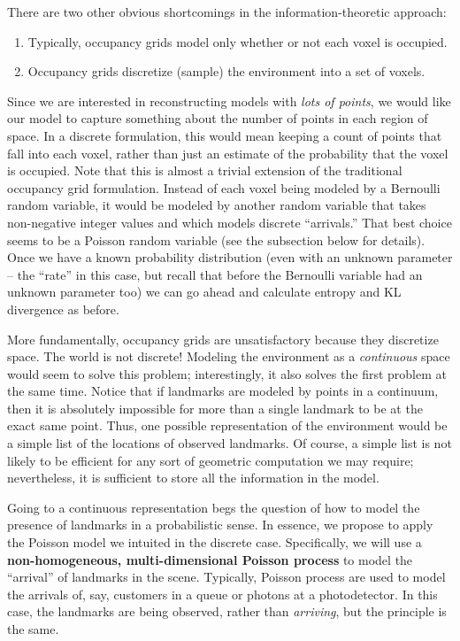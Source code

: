\documentclass[12pt]{article}
\begin{document}
There are two other obvious shortcomings in the information-theoretic approach:
\begin{enumerate}
\item Typically, occupancy grids model only whether or not each voxel is occupied.
\item Occupancy grids discretize (sample) the environment into a set of voxels.
\end{enumerate}

Since we are interested in reconstructing models with \textit{lots of points}, we would like our model to capture something about the number of points in each region of space. In a discrete formulation, this would mean keeping a count of points that fall into each voxel, rather than just an estimate of the probability that the voxel is occupied. Note that this is almost a trivial extension of the traditional occupancy grid formulation. Instead of each voxel being modeled by a Bernoulli random variable, it would be modeled by another random variable that takes non-negative integer values and which models discrete ``arrivals.'' That best choice seems to be a Poisson random variable (see the subsection below for details). Once we have a known probability distribution (even with an unknown parameter -- the ``rate'' in this case, but recall that before the Bernoulli variable had an unknown parameter too) we can go ahead and calculate entropy and KL divergence as before.

More fundamentally, occupancy grids are unsatisfactory because they discretize space. The world is not discrete! Modeling the environment as a \textit{continuous} space would seem to solve this problem; interestingly, it also solves the first problem at the same time. Notice that if landmarks are modeled by points in a continuum, then it is absolutely impossible for more than a single landmark to be at the exact same point. Thus, one possible representation of the environment would be a simple list of the locations of observed landmarks. Of course, a simple list is not likely to be efficient for any sort of geometric computation we may require; nevertheless, it is sufficient to store all the information in the model.

Going to a continuous representation begs the question of how to model the presence of landmarks in a probabilistic sense. In essence, we propose to apply the Poisson model we intuited in the discrete case. Specifically, we will use a \textbf{non-homogeneous, multi-dimensional Poisson process} to model the ``arrival'' of landmarks in the scene. Typically, Poisson process are used to model the arrivals of, say, customers in a queue or photons at a photodetector. In this case, the landmarks are being observed, rather than \textit{arriving}, but the principle is the same.
\end{document}
